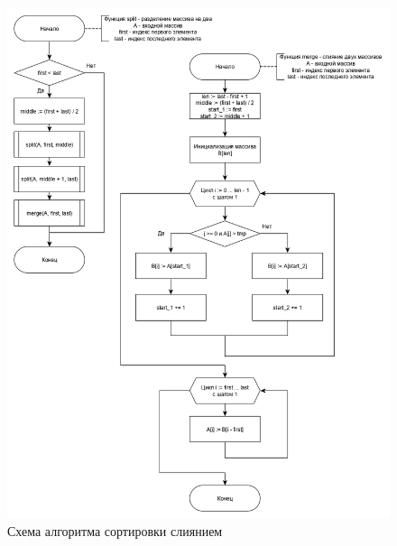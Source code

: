 \documentclass[12pt, a4paper]{report}
\begin{document}
	\begin{figure}[ht!]
		\centering
		\includegraphics[scale=0.55]{merge.png}
		\caption{Схема алгоритма сортировки слиянием}
		\label{pic:merge}
	\end{figure}
	\newpage
\end{document}
